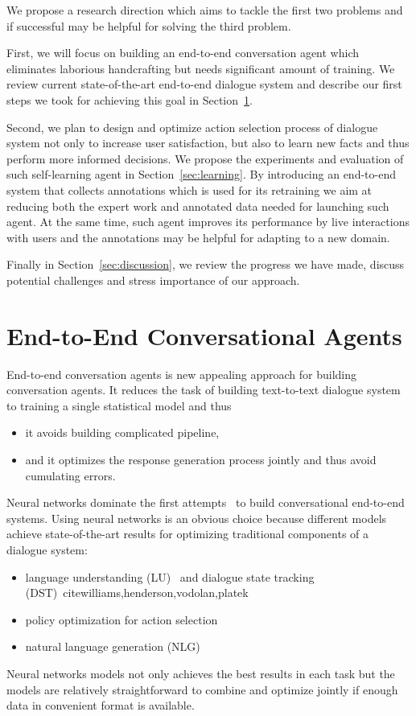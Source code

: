 \documentclass[11pt]{article}
\begin{document}
We propose a research direction which aims to tackle the first two problems and if successful may be helpful for solving the third problem.

First, we will focus on building an end-to-end conversation agent which eliminates laborious handcrafting but needs significant amount of training. 
We review current state-of-the-art end-to-end dialogue system and describe our first steps we took for achieving this goal in Section~\ref{sec:e2end}.

Second, we plan to design and optimize action selection process of dialogue system not only to increase user satisfaction, but also to learn new facts and thus perform more informed decisions.
We propose the experiments and evaluation of such self-learning agent in Section~\ref{sec:learning}.
By introducing an end-to-end system that collects annotations which is used for its retraining we aim at reducing both the expert work and annotated data needed for launching such agent.
At the same time, such agent improves its performance by live interactions with users and the annotations may be helpful for adapting to a new domain.

Finally in Section~\ref{sec:discussion}, we review the progress we have made, discuss potential challenges and stress importance of our approach.

\section{End-to-End Conversational Agents}
\label{sec:e2end}
End-to-end conversation agents is new appealing approach for building conversation agents.
It reduces the task of building text-to-text dialogue system to training a single statistical model and thus
\begin{itemize}
    \item it avoids building complicated pipeline,
    \item and it optimizes the response generation process jointly and thus avoid cumulating errors.
\end{itemize}

Neural networks dominate the first attempts~\citep{We,Williams,Weston,Dodge} to build conversational end-to-end systems.
Using neural networks is an obvious choice because different models achieve state-of-the-art results for optimizing traditional components of a dialogue system:
\begin{itemize}
    \item language understanding (LU)~\cite{todo} and dialogue state tracking (DST)~cite{williams,henderson,vodolan,platek}
    \item policy optimization for action selection~\cite{todo}
    \item natural language generation (NLG)~\cite{dusek,wen}
\end{itemize}
Neural networks models not only achieves the best results in each task but the models are relatively straightforward to combine and optimize jointly if enough data in convenient format is available.
\end{document}
